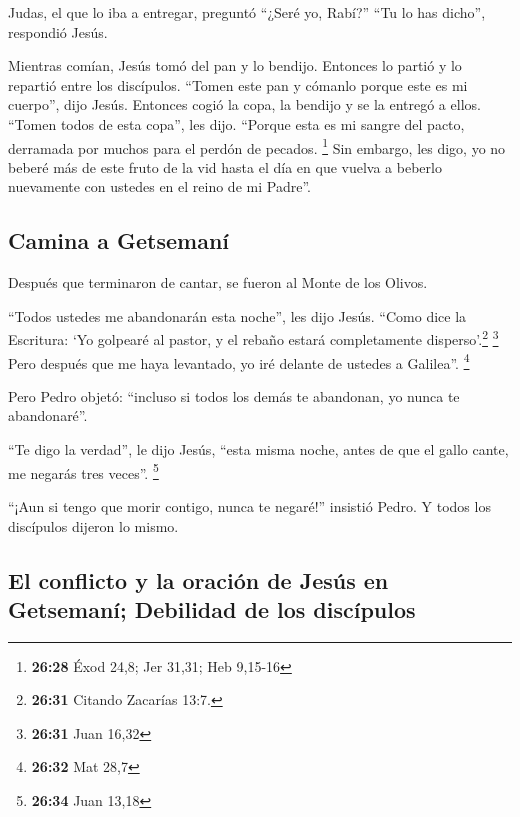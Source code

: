  Judas, el que lo iba a entregar, preguntó ``¿Seré yo,
Rabí?'' ``Tu lo has dicho'', respondió Jesús.

 Mientras comían, Jesús tomó del pan y lo bendijo.
Entonces lo partió y lo repartió entre los discípulos. ``Tomen este pan
y cómanlo porque este es mi cuerpo'', dijo Jesús. 
Entonces cogió la copa, la bendijo y se la entregó a ellos. ``Tomen
todos de esta copa'', les dijo.  ``Porque esta es mi
sangre del pacto, derramada por muchos para el perdón de pecados.
\footnote{\textbf{26:28} Éxod 24,8; Jer 31,31; Heb 9,15-16}
 Sin embargo, les digo, yo no beberé más de este fruto de
la vid hasta el día en que vuelva a beberlo nuevamente con ustedes en el
reino de mi Padre''.

\hypertarget{camina-a-getsemanuxed}{%
\subsection{Camina a Getsemaní}\label{camina-a-getsemanuxed}}

 Después que terminaron de cantar, se fueron al Monte de
los Olivos.

 ``Todos ustedes me abandonarán esta noche'', les dijo
Jesús. ``Como dice la Escritura: `Yo golpearé al pastor, y el rebaño
estará completamente disperso'.\footnote{\textbf{26:31} Citando Zacarías
  13:7.} \footnote{\textbf{26:31} Juan 16,32}  Pero
después que me haya levantado, yo iré delante de ustedes a Galilea''.
\footnote{\textbf{26:32} Mat 28,7}

 Pero Pedro objetó: ``incluso si todos los demás te
abandonan, yo nunca te abandonaré''.

 ``Te digo la verdad'', le dijo Jesús, ``esta misma
noche, antes de que el gallo cante, me negarás tres veces''. \footnote{\textbf{26:34}
  Juan 13,18}

 ``¡Aun si tengo que morir contigo, nunca te negaré!''
insistió Pedro. Y todos los discípulos dijeron lo mismo.

\hypertarget{el-conflicto-y-la-oraciuxf3n-de-jesuxfas-en-getsemanuxed-debilidad-de-los-discuxedpulos}{%
\subsection{El conflicto y la oración de Jesús en Getsemaní; Debilidad
de los
discípulos}\label{el-conflicto-y-la-oraciuxf3n-de-jesuxfas-en-getsemanuxed-debilidad-de-los-discuxedpulos}}

